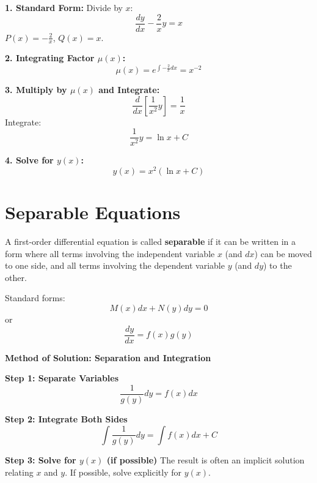 \documentclass[12pt, letterpaper]{book}
\theoremstyle{problemstyle}
\theoremstyle{solutionstyle}
\begin{document}
\textbf{1. Standard Form:}
Divide by $x$:
\begin{equation*}
    \frac{dy}{dx} - \frac{2}{x}y = x
\end{equation*}
$P(x) = -\frac{2}{x}$, $Q(x) = x$.

\textbf{2. Integrating Factor $\mu(x)$:}
\begin{equation*}
    \mu(x) = e^{\int -\frac{2}{x}dx} = x^{-2}
\end{equation*}

\textbf{3. Multiply by $\mu(x)$ and Integrate:}
\begin{equation*}
    \frac{d}{dx}\left[\frac{1}{x^2}y\right] = \frac{1}{x}
\end{equation*}
Integrate:
\begin{equation*}
    \frac{1}{x^2}y = \ln x + C
\end{equation*}

\textbf{4. Solve for $y(x)$:}
\begin{equation*}
    y(x) = x^2(\ln x + C)
\end{equation*}

\section{Separable Equations}
A first-order differential equation is called \textbf{separable} if it can be written in a form where all terms involving the independent variable $x$ (and $dx$) can be moved to one side, and all terms involving the dependent variable $y$ (and $dy$) to the other.

Standard forms:
\begin{equation*}
    M(x)dx + N(y)dy = 0
\end{equation*}
or
\begin{equation*}
    \frac{dy}{dx} = f(x)g(y)
\end{equation*}

\textbf{Method of Solution: Separation and Integration}

\textbf{Step 1: Separate Variables}
\begin{equation*}
    \frac{1}{g(y)}dy = f(x)dx
\end{equation*}

\textbf{Step 2: Integrate Both Sides}
\begin{equation*}
    \int \frac{1}{g(y)}dy = \int f(x)dx + C
\end{equation*}

\textbf{Step 3: Solve for $y(x)$ (if possible)}
The result is often an implicit solution relating $x$ and $y$. If possible, solve explicitly for $y(x)$.
\end{document}
